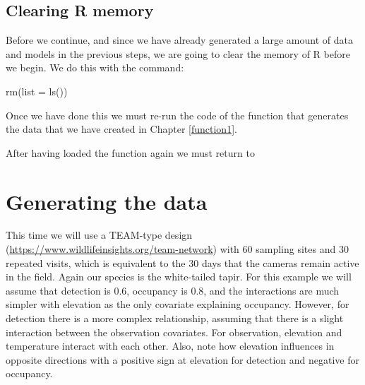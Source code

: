 \documentclass[
]{book}
\newenvironment{Shaded}{\begin{snugshade}}{\end{snugshade}}
\newcommand{\AttributeTok}[1]{\textcolor[rgb]{0.77,0.63,0.00}{#1}}
\newcommand{\FunctionTok}[1]{\textcolor[rgb]{0.00,0.00,0.00}{#1}}
\newcommand{\NormalTok}[1]{#1}
\begin{document}
\hypertarget{clearing-r-memory}{%
\subsection{Clearing R memory}\label{clearing-r-memory}}

Before we continue, and since we have already generated a large amount of data and models in the previous steps, we are going to clear the memory of R before we begin. We do this with the command:

\begin{Shaded}
\begin{Highlighting}[]
\FunctionTok{rm}\NormalTok{(}\AttributeTok{list =} \FunctionTok{ls}\NormalTok{())}
\end{Highlighting}
\end{Shaded}

Once we have done this we must re-run the code of the function that generates the data that we have created in Chapter \ref{function1}.

After having loaded the function again we must return to

\hypertarget{generating-the-data}{%
\section{Generating the data}\label{generating-the-data}}

This time we will use a TEAM-type design (\url{https://www.wildlifeinsights.org/team-network}) with 60 sampling sites and 30 repeated visits, which is equivalent to the 30 days that the cameras remain active in the field. Again our species is the white-tailed tapir. For this example we will assume that detection is 0.6, occupancy is 0.8, and the interactions are much simpler with elevation as the only covariate explaining occupancy. However, for detection there is a more complex relationship, assuming that there is a slight interaction between the observation covariates. For observation, elevation and temperature interact with each other. Also, note how elevation influences in opposite directions with a positive sign at elevation for detection and negative for occupancy.
\end{document}
